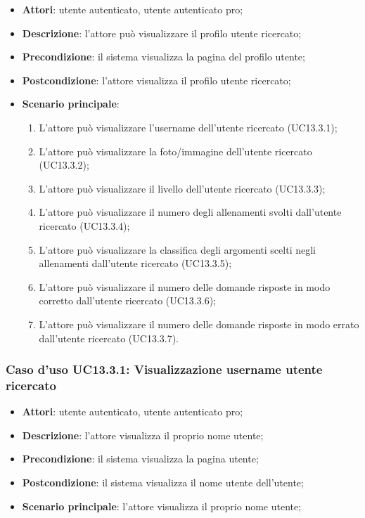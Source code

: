 \begin{itemize}
	\item \textbf{Attori}: utente autenticato, utente autenticato pro;
	\item \textbf{Descrizione}: l'attore può visualizzare il profilo utente ricercato;
	\item \textbf{Precondizione}: il sistema visualizza la pagina del profilo utente;
	\item \textbf{Postcondizione}: l'attore visualizza il profilo utente ricercato;
	\item \textbf{Scenario principale}:
	\begin{enumerate}
		\item L'attore può visualizzare l'username dell'utente ricercato (UC13.3.1);
		\item L'attore può visualizzare la foto/immagine dell'utente ricercato (UC13.3.2);
		\item L'attore può visualizzare il livello dell'utente ricercato (UC13.3.3);
		\item L'attore può visualizzare il numero degli allenamenti svolti dall'utente ricercato (UC13.3.4);
		\item L'attore può visualizzare la classifica degli argomenti scelti negli allenamenti dall'utente ricercato (UC13.3.5);
		\item L'attore può visualizzare il numero delle domande risposte in modo corretto dall'utente ricercato (UC13.3.6);
		\item L'attore può visualizzare il numero delle domande risposte in modo errato dall'utente ricercato (UC13.3.7).
	\end{enumerate}
\end{itemize}

\subsubsection{Caso d'uso UC13.3.1: Visualizzazione username utente ricercato}
\begin{itemize}
	\item\textbf{Attori}: utente autenticato, utente autenticato pro;
	\item\textbf{Descrizione}: l'attore visualizza il proprio nome utente;
	\item\textbf{Precondizione}: il sistema visualizza la pagina utente;
	\item\textbf{Postcondizione}: il sistema visualizza il nome utente dell'utente;
	\item\textbf{Scenario principale}: l'attore visualizza il proprio nome utente;
\end{itemize}

